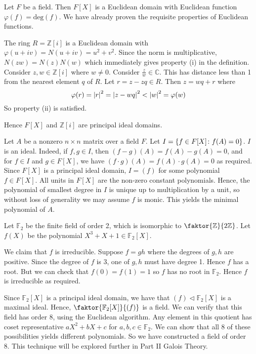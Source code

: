 \begin{example}
	Let \( F \) be a field.
	Then \( F[X] \) is a Euclidean domain with Euclidean function \( \varphi(f) = \mathrm{deg}(f) \).
	We have already proven the requisite properties of Euclidean functions.

	The ring \( R = \mathbb Z[i] \) is a Euclidean domain with \( \varphi(u+iv) = N(u+iv) = u^2+v^2 \).
	Since the norm is multiplicative, \( N(zw) = N(z)N(w) \) which immediately gives property (i) in the definition.
	Consider \( z, w \in \mathbb Z[i] \) where \( w \neq 0 \).
	Consider \( \frac{z}{w} \in \mathbb C \).
	This has distance less than 1 from the nearest element \( q \) of \( R \).
	Let \( r = z - z q \in R \).
	Then \( z = w q + r \) where
	\[ \varphi(r) = \abs{r}^2 = \abs{z - w q}^2 < \abs{w}^2 = \varphi(w) \]
	So property (ii) is satisfied.

	Hence \( F[X] \) and \( \mathbb Z[i] \) are principal ideal domains.
\end{example}
\begin{example}
	Let \( A \) be a nonzero \( n \times n \) matrix over a field \( F \).
	Let \( I = \qty{f \in F[X] \colon f(A) = 0} \).
	\( I \) is an ideal.
	Indeed, if \( f, g \in I \), then \( (f-g)(A) = f(A) - g(A) = 0 \), and for \( f \in I \) and \( g \in F[X] \), we have \( (f \cdot g)(A) = f(A) \cdot g(A) = 0 \) as required.
	Since \( F[X] \) is a principal ideal domain, \( I = (f) \) for some polynomial \( f \in F[X] \).
	All units in \( F[X] \) are the non-zero constant polynomials.
	Hence, the polynomial of smallest degree in \( I \) is unique up to multiplication by a unit, so without loss of generality we may assume \( f \) is monic.
	This yields the minimal polynomial of \( A \).
\end{example}
\begin{example}
	Let \( \mathbb F_2 \) be the finite field of order 2, which is isomorphic to \( \faktor{\mathbb Z}{2 \mathbb Z} \).
	Let \( f(X) \) be the polynomial \( X^3 + X + 1 \in \mathbb F_2[X] \).

	We claim that \( f \) is irreducible.
	Suppose \( f = gh \) where the degrees of \( g, h \) are positive.
	Since the degree of \( f \) is 3, one of \( g, h \) must have degree 1.
	Hence \( f \) has a root.
	But we can check that \( f(0) = f(1) = 1 \) so \( f \) has no root in \( \mathbb F_2 \).
	Hence \( f \) is irreducible as required.

	Since \( \mathbb F_2[X] \) is a principal ideal domain, we have that \( (f) \triangleleft \mathbb F_2[X] \) is a maximal ideal.
	Hence, \( \faktor{\mathbb F_2[X]}{(f)} \) is a field.
	We can verify that this field has order 8, using the Euclidean algorithm.
	Any element in this quotient has coset representative \( aX^2 + bX + c \) for \( a,b,c \in \mathbb F_2 \).
	We can show that all 8 of these possibilities yields different polynomials.
	So we have constructed a field of order 8.
	This technique will be explored further in Part II Galois Theory.
\end{example}
